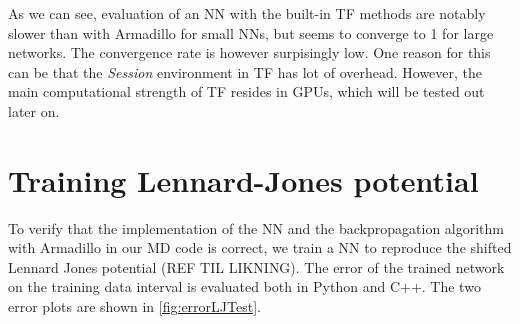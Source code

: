 \documentclass[twoside,english]{uiofysmaster}
\begin{document}
As we can see, evaluation of an NN with the built-in TF methods are notably slower than with Armadillo 
for small NNs, but seems to converge to 1 for large networks. The convergence rate is however surpisingly low. One reason for this
can be that the \textit{Session} environment in TF has lot of overhead. However, the main computational strength of TF resides 
in GPUs, which will be tested out later on. 


\section{Training Lennard-Jones potential}
To verify that the implementation of the NN and the backpropagation algorithm with Armadillo in our MD code is correct, 
we train a NN to reproduce the shifted Lennard Jones potential (REF TIL LIKNING). 
The error of the trained network on the training data interval is evaluated both in Python and C++. The two error
plots are shown in \autoref{fig:errorLJTest}. 
\end{document}
